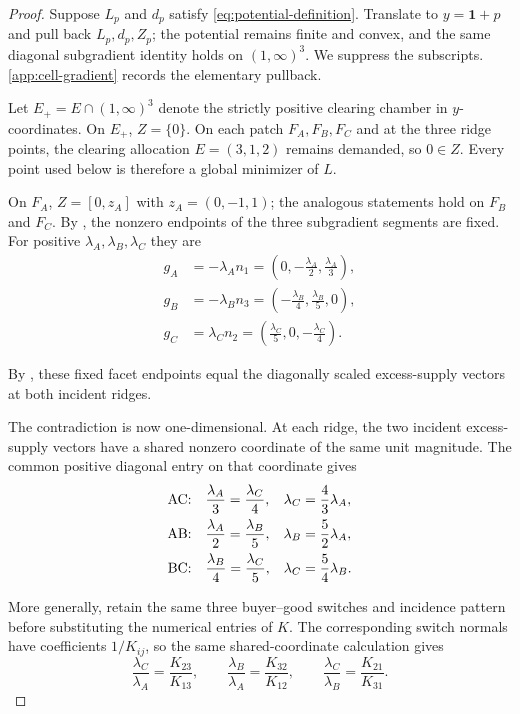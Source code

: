 \documentclass[11pt,a4paper,fleqn]{article}
\theoremstyle{plain}
\theoremstyle{definition}
\newcommand{\one}{\mathbf{1}}
\begin{document}
\begin{proof}
Suppose $L_p$ and $d_p$ satisfy \eqref{eq:potential-definition}. Translate to $y=\one+p$ and pull back $L_p,d_p,Z_p$; the potential remains finite and convex, and the same diagonal subgradient identity holds on $(1,\infty)^3$. We suppress the subscripts. \ref{app:cell-gradient} records the elementary pullback.

Let $E_+=E\cap(1,\infty)^3$ denote the strictly positive clearing chamber in $y$-coordinates. On $E_+$, $Z=\{0\}$. On each patch $F_A,F_B,F_C$ and at the three ridge points, the clearing allocation $E=(3,1,2)$ remains demanded, so $0\in Z$. Every point used below is therefore a global minimizer of $L$.

On $F_A$, $Z=[0,z_A]$ with $z_A=(0,-1,1)$; the analogous statements hold on $F_B$ and $F_C$. By , the nonzero endpoints of the three subgradient segments are fixed. For positive $\lambda_A,\lambda_B,\lambda_C$ they are
\begin{equation}\label{eq:facet-endpoints}
\begin{aligned}
g_A&=-\lambda_A n_1
=\left(0,-\frac{\lambda_A}{2},\frac{\lambda_A}{3}\right),\\
g_B&=-\lambda_B n_3
=\left(-\frac{\lambda_B}{4},\frac{\lambda_B}{5},0\right),\\
g_C&=\lambda_C n_2
=\left(\frac{\lambda_C}{5},0,-\frac{\lambda_C}{4}\right).
\end{aligned}
\end{equation}

By , these fixed facet endpoints equal the diagonally scaled excess-supply vectors at both incident ridges.

The contradiction is now one-dimensional. At each ridge, the two incident excess-supply vectors have a shared nonzero coordinate of the same unit magnitude. The common positive diagonal entry on that coordinate gives
\begin{align}
\text{AC:}\quad &\frac{\lambda_A}{3}=\frac{\lambda_C}{4},
&\lambda_C&=\frac43\lambda_A,\notag\\
\text{AB:}\quad &\frac{\lambda_A}{2}=\frac{\lambda_B}{5},
&\lambda_B&=\frac52\lambda_A,\notag\\
\text{BC:}\quad &\frac{\lambda_B}{4}=\frac{\lambda_C}{5},
&\lambda_C&=\frac54\lambda_B.\label{eq:ridge-ratios}
\end{align}

More generally, retain the same three buyer--good switches and incidence pattern before substituting the numerical entries of $K$. The corresponding switch normals have coefficients $1/K_{ij}$, so the same shared-coordinate calculation gives
\begin{equation}\label{eq:symbolic-ridge-ratios}
\frac{\lambda_C}{\lambda_A}=\frac{K_{23}}{K_{13}},
\qquad
\frac{\lambda_B}{\lambda_A}=\frac{K_{32}}{K_{12}},
\qquad
\frac{\lambda_C}{\lambda_B}=\frac{K_{21}}{K_{31}}.
\end{equation}


\end{proof}
\end{document}
